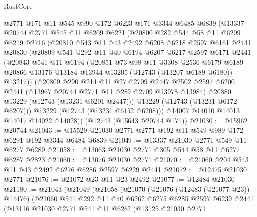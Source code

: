 \begin{lexlean}{RustCore}
\begin{coremodule}
    @2771
    @171
    @11
    @545
    @990
    @172
    @6223
    @171
    @3344
    @6485
    @6839
    (@13337
      @20744
      @2771
      @545
      @11
      @6209
      @6221
      (@20800
        @282
        @544
        @58
        @11
        @6209
        @6219
        @2716
        (@20810
          @543
          @11
          @43
          @2492
          @6208
          @6218
          @2597
          @6161
          @2441
          @20830
          (@20809
            @541
            @292
            @11
            @40
            @6194
            @6207
            @6217
            @2597
            @6171
            @2441
            (@20843
              @541
              @11
              @6194
              (@20851
                @73
                @98
                @11
                @3308
                @2536
                @6179
                @6189
                @20866
                @13176
                @13184
                @13944
                @13205
                (@12743 (@13207 @6189 @6180))
                @13217))
            (@20809
              @290
              @214
              @11
              @27
              @2709
              @2447
              @2502
              @2597
              @6200
              @2441
              (@13967 @20744 @2771 @11 @289 @2709 @13978 @13984)
              @20880
              @13229
              (@12743 (@13231 @6201 @2447)))
            @13229
            (@12743 (@13231 @6172 @6207)))
          @13229
          (@12743 (@13231 @6162 @6208)))
        @14007
        @14010
        @14013
        @14017
        @14022
        @14028))
    (@12743 (@15643 @20744 @171))
@21030 := @15962 @20744
@21043 := @15529 @21030 @2771 @2771 @192 @11 @549 @989 @172 @6291 @192 @3344 @6484 @6839
@21049 := @13337 @21030 @2771 @549 @11 @6277 @6289
@21058 := @13063 @21030 @2771 @305 @544 @58 @11 @6277 @6287 @2823
@21060 := @13076 @21030 @2771
@21070 := @21060 @204 @543 @11 @43 @2492 @6276 @6286 @2597 @6229 @2441
@21072 := @12475 @21030 @2771
@21076 := @21072 @23 @11 @23 @2492
@21077 := @12484 @21030
@21180 := @21043
    (@21049
      (@21058
        (@21070
          (@21076 (@12483 (@21077 @23)) @14476)
          (@21060
            @541
            @292
            @11
            @40
            @6262
            @6275
            @6285
            @2597
            @6239
            @2441
            (@13116
              @21030
              @2771
              @541
              @11
              @6262
              (@13125
                @21030
                @2771

\end{coremodule}
\end{lexlean}
